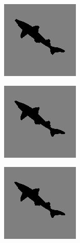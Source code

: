 \documentclass{article}
\begin{document}
\begin{figure}[h]
\caption{}
\centering
\includegraphics{images/rebuilt_image2.jpg}
\end{figure}

\begin{figure}[h]
\caption{}
\centering
\includegraphics{images/rebuilt_image1.jpg}
\end{figure}

\begin{figure}[h]
\caption{}
\centering
\includegraphics{images/rebuilt_image0.jpg}
\end{figure}
\end{document}
